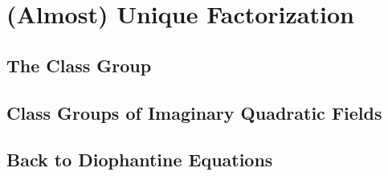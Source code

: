 \documentclass[../notes.tex]{subfiles}
\begin{document}
\section{(Almost) Unique Factorization} \label{sec:upf}

\subsection{The Class Group}

\subsection{Class Groups of Imaginary Quadratic Fields}

\subsection{Back to Diophantine Equations}
\end{document}
